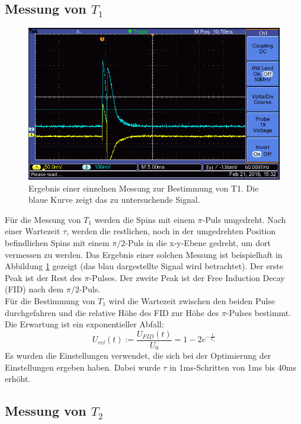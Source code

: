 \documentclass[12pt,a4paper]{article}
\begin{document}
\subsection{Messung von $T_1$}

\begin{figure}
\centering
\includegraphics[scale=0.8]{Bilder/F0003TEK.PNG}
\caption{Ergebnis einer einzelnen Messung zur Bestimmung von T1. Die blaue Kurve zeigt das zu untersuchende Signal.}
\label{fig:MessungT1_Beispiel}
\end{figure}

Für die Messung von $T_1$ werden die Spins mit einem $\pi$-Puls umgedreht. Nach einer Wartezeit $\tau$, werden die restlichen, noch in der umgedrehten Position befindlichen Spins mit einem $\pi /2$-Puls in die x-y-Ebene gedreht, um dort vermessen zu werden. Das Ergebnis einer solchen Messung ist beispielhaft in Abbildung \ref{fig:MessungT1_Beispiel} gezeigt (das blau dargestellte Signal wird betrachtet). Der erste Peak ist der Rest des $\pi$-Pulses. Der zweite Peak ist der Free Induction Decay (FID) nach dem $\pi /2$-Puls. \\
Für die Bestimmung von $T_1$ wird die Wartezeit zwischen den beiden Pulse durchgefahren und die relative Höhe des FID zur Höhe des $\pi$-Pulses bestimmt. Die Erwartung ist ein exponentieller Abfall:
\begin{equation}
\label{eq:T1_Exponentialfunktion}
U_{rel} (t) := \dfrac{U_{FID} (t)}{U_0} = 1 - 2 e^{-\frac{t}{T_1}}
\end{equation}
Es wurden die Einstellungen verwendet, die sich bei der Optimierung der Einstellungen ergeben haben. Dabei wurde $\tau$ in 1ms-Schritten von 1ms bis 40ms erhöht.

\subsection{Messung von $T_2$}
\end{document}
